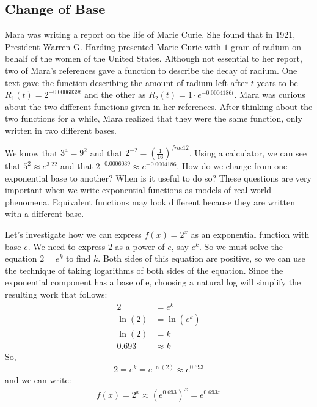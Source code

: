 \documentclass[10pt,]{book}
\theoremstyle{plain}
\theoremstyle{definition}
\theoremstyle{definition}
\theoremstyle{definition}
\numberwithin{equation}{section}
\newcommand{\amp}{&}
\begin{document}
\subsection[{Change of Base}]{Change of Base}\label{subsection-5}
\hypertarget{p-378}{}%
Mara was writing a report on the life of Marie Curie.  She found that in 1921, President Warren G. Harding presented Marie Curie with \(1\) gram of radium on behalf of the women of the United States.  Although not essential to her report, two of Mara's references gave a function to describe the decay of radium. One text gave the function describing the amount of radium left after \(t\) years to be \(R_1(t) = 2^{-0.0006039t}\) and the other as \(R_2(t) = 1 \cdot e^{-0.0004186t}\).  Mara was curious about the two different functions given in her references. After thinking about the two functions for a while, Mara realized that they were the same function, only written in two different bases.%
\par
\hypertarget{p-379}{}%
We know that \(3^4 = 9^2\) and that \(2^{-2} = \left( \frac{1}{16} \right)^{frac{1}{2}}\). Using a calculator, we can see that \(5^2 \approx e^3.22\) and that \(2^{-0.0006039} \approx e^{-0.0004186}\). How do we change from one exponential base to another? When is it useful to do so? These questions are very important when we write exponential functions as models of real-world phenomena. Equivalent functions may look different because they are written with a different base.%
\par
\hypertarget{p-380}{}%
Let's investigate how we can express \(f(x) = 2^x\) as an exponential function with base \(e\). We need to express \(2\) as a power of \(e\), say \(e^k\). So we must solve the equation \(2 = e^k\) to find \(k\).  Both sides of this equation are positive, so we can use the technique of taking logarithms of both sides of the equation. Since the exponential component has a base of e, choosing a natural log will simplify the resulting work that follows:%
\begin{align*}
2 \amp = e^k\\
\ln \left( 2 \right) \amp = \ln \left( e^k \right)\\
\ln \left( 2 \right) \amp = k\\
0.693 \amp \approx k
\end{align*}
So,%
\begin{gather*}
2 = e^k = e^{\ln(2)} \approx e^{0.693}
\end{gather*}
and we can write:%
\begin{gather*}
f(x) = 2^x \approx \left( e^{0.693} \right)^x = e^{0.693x}
\end{gather*}
\end{document}
